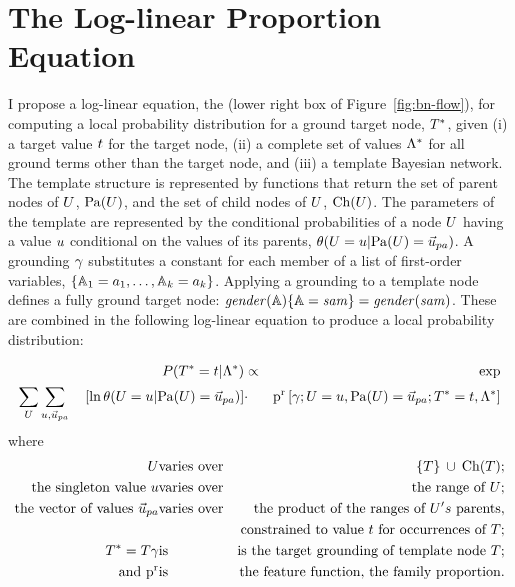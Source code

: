 \documentclass{sfuthesis}
\renewcommand{\Qconj}{\Appendterm{\FG{\TT} = \TV} {\QC}} %
\begin{document}
\section{The Log-linear Proportion Equation} \label{sec:theequation}

I  propose a log-linear equation, the  (lower right box of Figure~\ref{fig:bn-flow}), for computing a local probability distribution for a ground target node, $T^{*}\hspace{0.0ex}$, given (i) a target value $t$ for the target node, (ii) a complete set of values $\Lambda^{*}\hspace{0.0ex}$  for all ground terms other than the target node, and (iii) a template Bayesian network. The template structure is represented by functions that return the set of parent nodes of $U$, $\mathrm{Pa}(U)$, and the set of child nodes of $U$, $\mathrm{Ch}(U)$. The parameters of the template are
represented by the conditional probabilities of a node $U$ having a value $u$ conditional on the values of its parents, $\cprob{\UT = \UV}{\Pa{\UT} = \Prange{\UT}}$. A grounding $\gamma$ substitutes a constant for each member of a list of first-order variables, $\{\mathbb{A}_{1} = a_{1},\ldots, \mathbb{A}_{k} = a_{k}\}$. Applying a grounding to a template node defines a fully ground target node: $\it{gender}(\mathbb{A}) \{\mathbb{A} = sam\} = \it{gender}(sam)$.  These are combined in the following log-linear equation to produce a local probability distribution:

%
\begin{definition}\label{def:log-diff-freq-eq}
\begin{eqnarray*}
  \Gprob{\FG{{\TT}} = \TV} {\QC} &\propto &  \exp\\
 \sum_{\UT} \sum_{\UV,\Prange{\UT}}   \quad \left[ \ln \cprob{\UT = \UV}{\Pa{\UT} = \Prange{\UT}} \right] &
    \cdot &
    \Relfreq{\Appendterm{\grounding;\UT  = \UV} {\Pa{\UT} = \Prange{\UT}}} {\Qconj}
\end{eqnarray*}
where 
\begin{eqnarray*}
\UT &\mathrm{varies\ over} & \Setaddterm{\{\TT\}} {\Ch{\TT}}; \\
\mbox{the singleton value} \ \UV & \mathrm{varies\ over} & \mbox{the range of}\  \UT;\\
\mbox{the vector of values} \ \Prange{\UT} & \mathrm{varies\ over} & \mbox{the product of the ranges of} \ \UT's\ \mbox{parents}, \\
& & \mbox{constrained to value} \ \TV \ \mbox{for occurrences of} \ \TT;\\
\FG{\TT} = \TT \grounding&\mathrm{is} & \mbox{is the target grounding of template node }  \TT; \\
\mbox{and}~\Relevant{\Fvar} &\mathrm{is} & \mbox{the feature function, the family proportion}.
\end{eqnarray*}
\end{definition}
\end{document}
